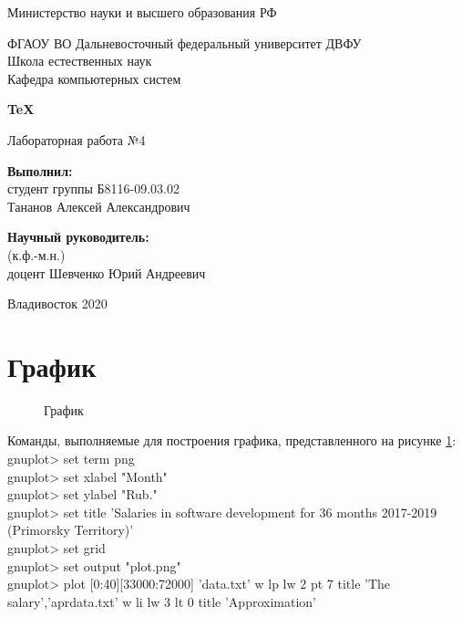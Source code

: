 \documentclass[a4paper,12pt]{article}         %
\begin{document}
\begin{titlepage}
\begin{center}
Министерство науки и высшего образования РФ

ФГАОУ ВО Дальневосточный федеральный университет \flqq ДВФУ\frqq\\

Школа естественных наук\\
Кафедра компьютерных систем\\
\end{center}

\vspace{5cm}

\begin{center}
\LARGE \bf{TeX}
\end{center}

\begin{center}\large
Лабораторная работа №4
\end{center}

\vspace{3cm}

\large
\begin{flushright}
\textbf{Выполнил:}\\
студент группы Б8116-09.03.02\\
Тананов Алексей Александрович\\

\vspace{1cm}

\textbf{Научный руководитель:}\\
(к.ф.-м.н.) \\
доцент Шевченко Юрий Андреевич
\end{flushright}

\vspace{1cm}

\begin{center}
Владивосток 2020
\end{center}
\end{titlepage}

\tableofcontents
\newpage
\section{График}
\label{sec:sec0}
\begin{figure}[h]
	\caption{График}
	\label{fig:plot}
\end{figure}
Команды, выполняемые для построения графика, представленного на рисунке \ref{fig:plot}:\\
gnuplot> set term png\\
gnuplot> set xlabel "Month"\\   
gnuplot> set ylabel "Rub."  \\  
gnuplot> set title 'Salaries in software development for 36 months 2017-2019 (Primorsky Territory)'  \\
gnuplot> set grid\\
gnuplot> set output "plot.png"\\   
gnuplot> plot [0:40][33000:72000] 'data.txt' w lp lw 2 pt 7 title 'The salary','aprdata.txt' w li lw 3 lt 0 title 'Approximation'\\
\end{document}
